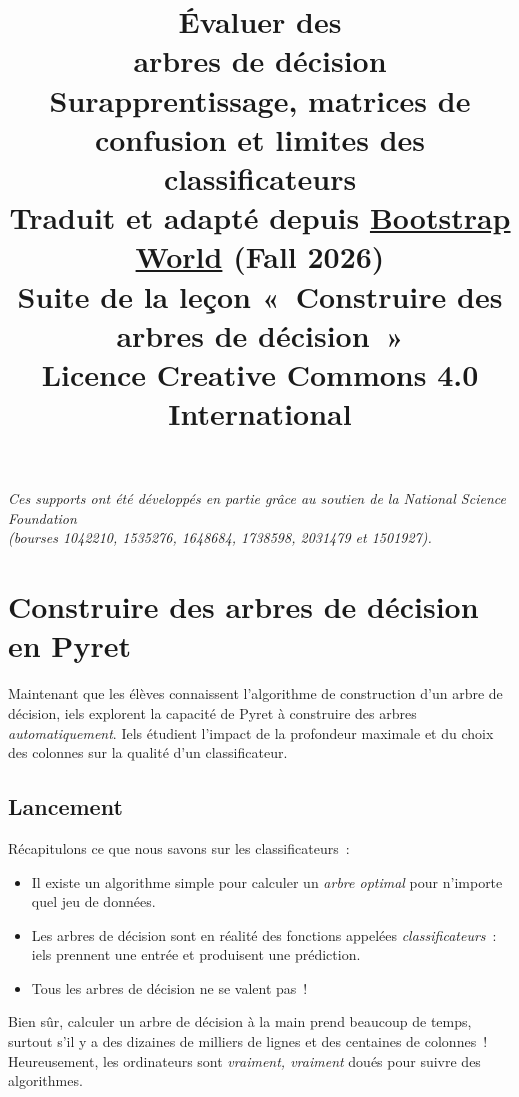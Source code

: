 \documentclass[12pt,a4paper]{article}
\title{%
  \vspace{-2cm}
  {\Huge\bfseries Évaluer des}\\[0.3em]
  {\Huge\bfseries arbres de décision}\\[0.5em]
  {\large Surapprentissage, matrices de confusion et limites des classificateurs}\\[1em]
  {\normalsize Traduit et adapté depuis \href{https://www.bootstrapworld.org/materials/fall2026/en-us/lessons/decision-trees-evaluating/}{Bootstrap World} (Fall 2026)}\\
  {\normalsize Suite de la leçon «~Construire des arbres de décision~»}\\[0.5em]
  {\normalsize Licence Creative Commons 4.0 International}
}
\date{}
\author{}
\begin{document}
\maketitle
\thispagestyle{empty}

\vspace{2cm}
\begin{center}
  \textit{Ces supports ont été développés en partie grâce au soutien de la National Science Foundation\\
  (bourses 1042210, 1535276, 1648684, 1738598, 2031479 et 1501927).}
\end{center}

\newpage
\tableofcontents
\newpage

\section{Construire des arbres de décision en Pyret}

\begin{overviewbox}
  Maintenant que les élèves connaissent l'algorithme de construction d'un arbre de décision, iels explorent la capacité de Pyret à construire des arbres \emph{automatiquement}. Iels étudient l'impact de la profondeur maximale et du choix des colonnes sur la qualité d'un classificateur.
\end{overviewbox}

\subsection{Lancement}

Récapitulons ce que nous savons sur les classificateurs~:

\begin{itemize}
  \item Il existe un algorithme simple pour calculer un \emph{arbre optimal} pour n'importe quel jeu de données.
  \item Les arbres de décision sont en réalité des fonctions appelées \emph{classificateurs}~: iels prennent une entrée et produisent une prédiction.
  \item Tous les arbres de décision ne se valent pas~!
\end{itemize}

Bien sûr, calculer un arbre de décision à la main prend beaucoup de temps, surtout s'il y a des dizaines de milliers de lignes et des centaines de colonnes~! Heureusement, les ordinateurs sont \emph{vraiment, vraiment} doués pour suivre des algorithmes.
\end{document}
